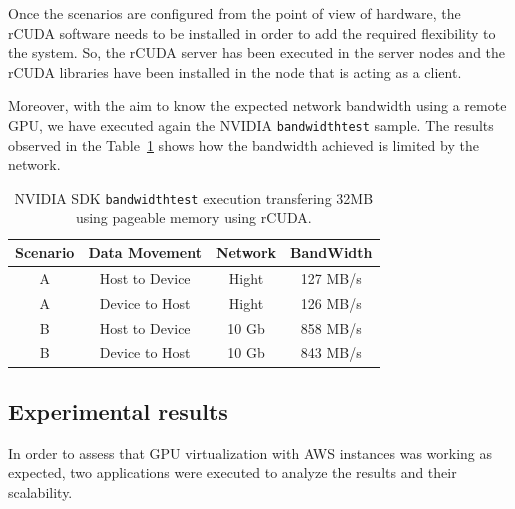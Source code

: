 \documentclass[a4paper,twoside]{article}
\begin{document}
Once the scenarios are configured from the point of view of hardware, 
the {rCUDA} software needs to be installed in order to add 
the required flexibility to the system. So, the {rCUDA} server has been 
executed in the server nodes and the {rCUDA} libraries have been installed 
in the node that is acting as a client.

Moreover, with the aim to know the expected network bandwidth using 
a remote GPU, we have executed again the NVIDIA {\tt bandwidthtest} sample.
The results observed in the Table~\ref{table:bwtrcuda} shows how the bandwidth achieved is limited 
by the network.

\begin{table}[htb]
\renewcommand{\arraystretch}{1.3}
\caption{NVIDIA SDK {\tt bandwidthtest} execution transfering 32MB using pageable memory using {rCUDA}.}
\label{table:bwtrcuda}
\tabcolsep=0.09cm
\begin{center}\begin{tabular}{cccc}
Scenario &  Data Movement & Network & BandWidth \\ \hline \hline
A & Host to Device & Hight& 127 MB/s \\ \hline
A & Device to Host & Hight& 126 MB/s\\ \hline
B & Host to Device & 10 Gb& 858 MB/s\\ \hline
B & Device to Host & 10 Gb& 843 MB/s\\ \hline
\end{tabular}\end{center}\end{table}




\subsection{Experimental results}
In order to assess that GPU virtualization with AWS instances was working as expected, two applications were executed to analyze the results and their scalability.
\end{document}
